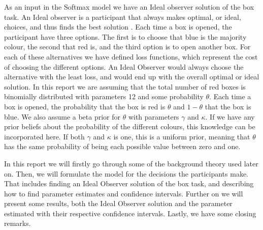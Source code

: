 As an input in the Softmax model we have an Ideal observer solution of the box task. An Ideal observer is a participant that always makes optimal, or ideal, choices, and thus finds the best solution \citep{idealObs}. Each time a box is opened, the participant have three options. The first is to choose that blue is the majority colour, the second that red is, and the third option is to open another box. For each of these alternatives we have defined loss functions, which represent the cost of choosing the different options. An Ideal Observer would always choose the alternative with the least loss, and would end up with the overall optimal or ideal solution. In this report we are assuming that the total number of red boxes is binomially distributed with parameters 12 and some probability $\theta$. Each time a box is opened, the probability that the box is red is $\theta$ and $1-\theta$ that the box is blue. We also assume a beta prior for $\theta$ with parameters $\gamma$ and $\kappa$. If we have any prior beliefs about the probability of the different colours, this knowledge can be incorporated here. If both $\gamma$ and $\kappa$ is one, this is a uniform prior, meaning that $\theta$ has the same probability of being each possible value between zero and one. 





In this report we will firstly go through some of the background theory used later on. Then, we will formulate the model for the decisions the participants make. That includes finding an Ideal Observer solution of the box task, and describing how to find parameter estimates and confidence intervals. Further on we will present some results, both the Ideal Observer solution and the parameter estimated with their respective confidence intervals. Lastly, we have some closing remarks. 